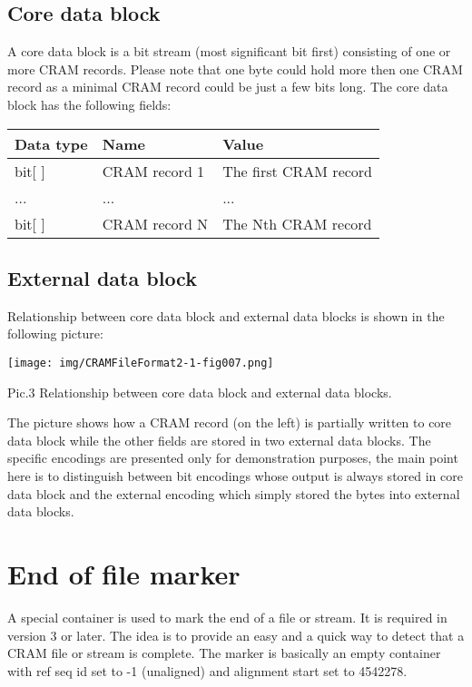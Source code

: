 \documentclass[a4paper]{article}
\begin{document}
\subsection{\textbf{Core data block}}

A core data block is a bit stream (most significant bit first) consisting of one 
or more CRAM records. Please note that one byte could hold more then one CRAM record 
as a minimal CRAM record could be just a few bits long. The core data block has 
the following fields:

\begin{tabular}{|l|>{\raggedright}p{120pt}|>{\raggedright}p{260pt}|}
\hline
\textbf{Data type} & \textbf{Name} & \textbf{Value}
\tabularnewline
\hline
bit[ ] & CRAM record 1 & The first CRAM record\tabularnewline
\hline
... & ... & ...\tabularnewline
\hline
bit[ ] & CRAM record N & The Nth CRAM record \tabularnewline
\hline
\end{tabular}

\subsection{\textbf{External data block}}

Relationship between core data block and external data blocks is shown in the following 
picture: 

\texttt{[image: img/CRAMFileFormat2-1-fig007.png]}

Pic.3 Relationship between core data block and external data blocks.

The picture shows how a CRAM record (on the left) is partially written to core 
data block while the other fields are stored in two external data blocks. The specific 
encodings are presented only for demonstration purposes, the main point here is 
to distinguish between bit encodings whose output is always stored in core data 
block and the external encoding which simply stored the bytes into external data 
blocks.

\section{\textbf{End of file marker}}

A special container is used to mark the end of a file or stream. It is required in version 3 or later. The idea is to provide an easy and a quick way to detect that a CRAM file or stream is complete. The marker is basically an empty container with ref seq id set to -1 (unaligned) and alignment 
start set to 4542278.
\end{document}
